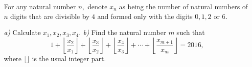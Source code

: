 For any natural number $ n, $ denote $ x_n $ as being the number of natural numbers of $ n $ digits that are divisible by $ 4 $ and formed only with the digits $ 0,1,2 $ or $ 6. $

\textit{a)} Calculate $ x_1,x_2,x_3,x_4. $
\textit{b)} Find the natural number $ m $ such that
$$ 1+\left\lfloor \frac{x_2}{x_1}\right\rfloor +\left\lfloor \frac{x_3}{x_2}\right\rfloor +\left\lfloor \frac{x_4}{x_3}\right\rfloor +\cdots +\left\lfloor \frac{x_{m+1}}{x_m}\right\rfloor =2016 , $$where $ \lfloor\rfloor $ is the usual integer part.